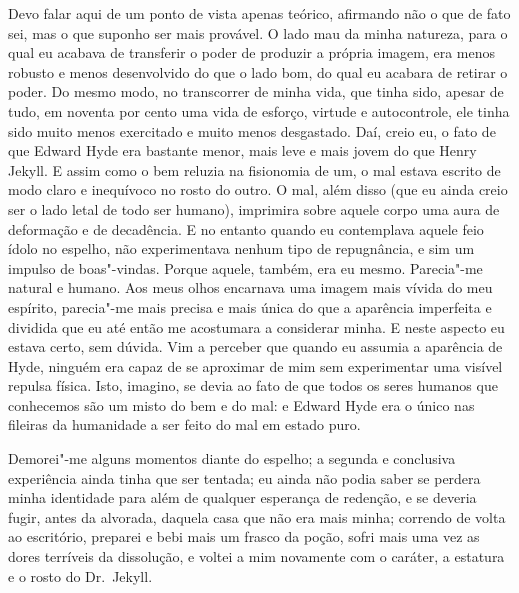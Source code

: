 Devo falar aqui de um ponto de vista apenas teórico, afirmando não o que
de fato sei, mas o que suponho ser mais provável.  O lado mau da minha
natureza, para o qual eu acabava de transferir o poder de produzir a
própria imagem, era menos robusto e menos desenvolvido do que o lado
bom, do qual eu acabara de retirar o poder. Do mesmo modo, no
transcorrer de minha vida, que tinha sido, apesar de tudo, em noventa
por cento uma vida de esforço, virtude e autocontrole, ele tinha sido
muito menos exercitado e muito menos desgastado.  Daí, creio eu, o fato
de que Edward Hyde era bastante menor, mais leve e mais jovem do que
Henry Jekyll.  E assim como o bem reluzia na fisionomia de um, o mal
estava escrito de modo claro e inequívoco no rosto do outro.  O mal,
além disso (que eu ainda creio ser o lado letal de todo ser humano),
imprimira sobre aquele corpo uma aura de deformação e de decadência.  E
no entanto quando eu contemplava aquele feio ídolo no espelho, não
experimentava nenhum tipo de repugnância, e sim um impulso de
boas"-vindas.  Porque aquele, também, era eu mesmo.  Parecia"-me natural
e humano.  Aos meus olhos encarnava uma imagem mais vívida do meu
espírito, parecia"-me mais precisa e mais única do que a aparência
imperfeita e dividida que eu até então me acostumara a considerar
minha.  E neste aspecto eu estava certo, sem dúvida.  Vim a perceber
que quando eu assumia a aparência de Hyde, ninguém era capaz de se
aproximar de mim sem experimentar uma visível repulsa física.  Isto,
imagino, se devia ao fato de que todos os seres humanos que conhecemos
são um misto do bem e do mal: e Edward Hyde era o único nas fileiras da
humanidade a ser feito do mal em estado puro.

Demorei"-me alguns momentos diante do espelho; a segunda e conclusiva
experiência ainda tinha que ser tentada; eu ainda não podia saber se
perdera minha identidade para além de qualquer esperança de redenção, e
se deveria fugir, antes da alvorada, daquela casa que não era mais
minha; correndo de volta ao escritório, preparei e bebi mais um frasco
da poção, sofri mais uma vez as dores terríveis da dissolução, e voltei
a mim novamente com o caráter, a estatura e o rosto do Dr.~Jekyll.

